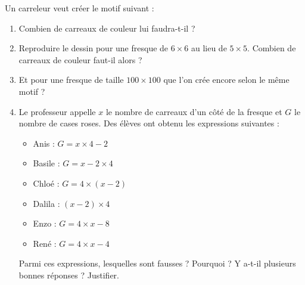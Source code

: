 
Un carreleur veut créer le motif suivant :
\begin{center}
   
\end{center}
\begin{enumerate}
    \item
Combien de carreaux de couleur lui faudra-t-il ? 
\item
Reproduire le dessin pour une fresque de \( 6\times 6\) au lieu de \( 5\times 5\). Combien de carreaux de couleur faut-il alors ? 
\item
Et pour une fresque de taille \( 100\times 100\) que l'on crée encore selon le même motif ?
\item
Le professeur appelle $x$ le nombre de carreaux d'un côté de la fresque et $G$ le nombre de cases roses. Des élèves ont obtenu les expressions suivantes :
\begin{multicols}{3}
    \begin{itemize}
        \item
            Anis : \( G=x\times 4-2\)
        \item
            Basile : \( G=x-2\times 4\)
        \item
            Chloé : \( G=4\times (x-2)\)
        \item
             Dalila : \( (x-2)\times 4 \)
         \item
             Enzo : \( G=4\times x-8\)
         \item
             René : \( G=4\times x-4\)
    \end{itemize}
\end{multicols}
Parmi ces expressions, lesquelles sont fausses ? Pourquoi ? Y a-t-il plusieurs bonnes réponses ? Justifier.
\end{enumerate}


